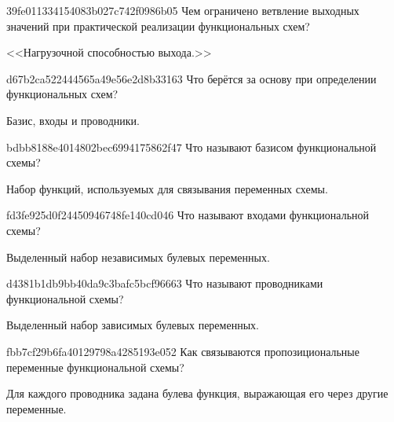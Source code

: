 \begin{note}{39fe011334154083b027c742f0986b05}
    Чем ограничено ветвление выходных значений при практической реализации функциональных схем?

    \begin{cloze}{1}
        <<Нагрузочной способностью выхода.>>
    \end{cloze}
\end{note}

\begin{note}{d67b2ca522444565a49e56e2d8b33163}
    Что берётся за основу при определении функциональных схем?

    \begin{cloze}{1}
        Базис, входы и проводники.
    \end{cloze}
\end{note}

\begin{note}{bdbb8188e4014802bec6994175862f47}
    Что называют базисом функциональной схемы?

    \begin{cloze}{1}
        Набор функций, используемых для связывания переменных схемы.
    \end{cloze}
\end{note}

\begin{note}{fd3fe925d0f24450946748fe140cd046}
    Что называют входами функциональной схемы?

    \begin{cloze}{1}
        Выделенный набор независимых булевых переменных.
    \end{cloze}
\end{note}

\begin{note}{d4381b1db9bb40da9c3bafc5bcf96663}
    Что называют проводниками функциональной схемы?

    \begin{cloze}{1}
        Выделенный набор зависимых булевых переменных.
    \end{cloze}
\end{note}

\begin{note}{fbb7cf29b6fa40129798a4285193e052}
    Как связываются пропозициональные переменные функциональной схемы?

    \begin{cloze}{1}
        Для каждого проводника задана булева функция, выражающая его через другие переменные.
    \end{cloze}
\end{note}

